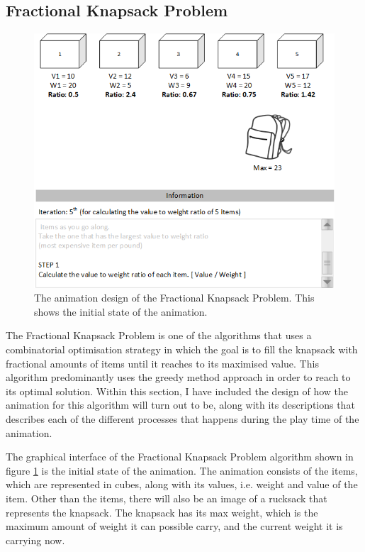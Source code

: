 \subsection{Fractional Knapsack Problem}
\begin{figure}[H]
\centering
\includegraphics[scale=1]{images/report_images/animationDesignFractionalKnapsackProblem_STEP1.png}
\caption{The animation design of the Fractional Knapsack Problem. This shows the initial state of the animation.}
\label{animationDesignFractionalKnapsackProblem}
\end{figure}

The Fractional Knapsack Problem is one of the algorithms that uses a combinatorial optimisation strategy in which the goal is to fill the knapsack with fractional amounts of items until it reaches to its maximised value. This algorithm predominantly uses the greedy method approach in order to reach to its optimal solution. Within this section, I have included the design of how the animation for this algorithm will turn out to be, along with its descriptions that describes each of the different processes that happens during the play time of the animation.

The graphical interface of the Fractional Knapsack Problem algorithm shown in figure \ref{animationDesignFractionalKnapsackProblem} is the initial state of the animation. The animation consists of the items, which are represented in cubes, along with its values, i.e. weight and value of the item. Other than the items, there will also be an image of a rucksack that represents the knapsack. The knapsack has its max weight, which is the maximum amount of weight it can possible carry, and the current weight it is carrying now.

